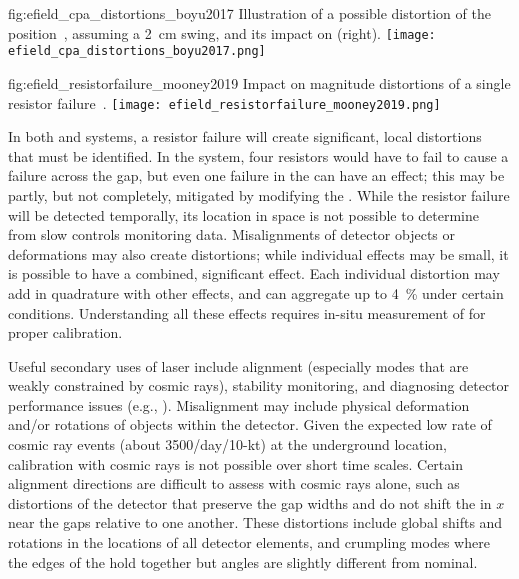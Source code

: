 \begin{dunefigure}{fig:efield_cpa_distortions_boyu2017}
{Illustration of a possible distortion of the  position~\cite{bib:yu2017a}, assuming a \SI{2}{\cm} swing, and its impact on \efield (right).}
\texttt{[image: efield\_cpa\_distortions\_boyu2017.png]}
\end{dunefigure}

\begin{dunefigure}{fig:efield_resistorfailure_mooney2019}
{Impact on \efield magnitude distortions of a single  resistor failure~\cite{bib:mooney2019a}.}
\texttt{[image: efield\_resistorfailure\_mooney2019.png]}
\end{dunefigure}

In both  and  systems, a resistor failure will create significant, local \efield distortions that must be identified. In the  system, four resistors would have to fail to cause a failure across the  gap, but even one failure in the  can have an effect; this may be partly, but not completely, mitigated by modifying the . While the resistor failure will be detected temporally, its location in space is not possible to determine from slow controls monitoring data. Misalignments of detector objects or deformations may also create  \efield distortions; while individual effects may be small, it is possible to have a combined, significant effect.
Each individual \efield distortion may add in quadrature with other effects, and can aggregate up to \SI{4}{\%} under certain conditions. Understanding all these effects requires in-situ  measurement of \efield for proper calibration. 

Useful secondary uses of laser include alignment (especially modes that are weakly constrained by cosmic rays),
stability monitoring, and diagnosing detector performance issues
(e.g., ).  
Misalignment may include physical deformation and/or rotations of objects within the detector. Given the expected low rate of cosmic ray events (about 3500/day/10-kt) at the underground location, calibration with cosmic rays is not possible over short time scales. Certain alignment directions  are difficult to assess with cosmic rays alone, such as distortions of the detector that preserve the gap widths and do not shift the  in $x$ near the gaps relative to one another.
These distortions include global shifts and rotations in the locations of all detector elements, and crumpling modes where the edges of the  hold together but angles are slightly different from nominal.   

